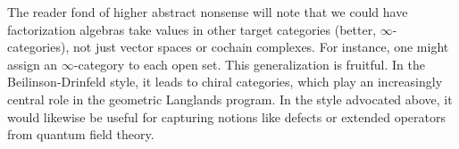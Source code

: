 \documentclass[11pt]{amsart}
\def\mc{\mathcal}
\def\mcol{\, | \,}
\def\Disj{\operatorname{Disj}}
\def\owen#1{{\textcolor{violet!65!black}{OG: {#1}}}}
\begin{document}
\begin{rmk}
The reader fond of higher abstract nonsense will note that we could have factorization algebras take values in other target categories (better, $\infty$-categories),
not just vector spaces or cochain complexes.
For instance, one might assign an $\infty$-category to each open set.
This generalization is fruitful.
In the Beilinson-Drinfeld style, it leads to chiral categories, which play an increasingly central role in the geometric Langlands program.
In the style advocated above, it would likewise be useful for capturing notions like defects or extended operators from quantum field theory.
\end{rmk}

%
%
%
%
\end{document}
